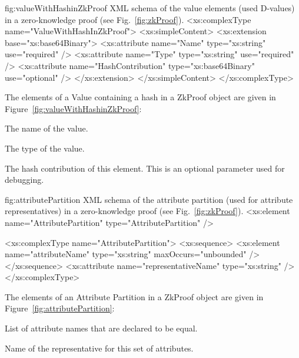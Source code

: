 \begin{xml}
{fig:valueWithHashinZkProof}
{XML schema of the value elements (used D-values) in a 
zero-knowledge proof (see Fig.~\ref{fig:zkProof}).}
<xs:complexType name="ValueWithHashInZkProof">
  <xs:simpleContent>
    <xs:extension base="xs:base64Binary">
      <xs:attribute name="Name" type="xs:string" use="required" />
      <xs:attribute name="Type" type="xs:string" use="required" />
      <xs:attribute name="HashContribution" type="xs:base64Binary"
        use="optional" />
    </xs:extension>
  </xs:simpleContent>
</xs:complexType>
\end{xml}

\vspace{3pt}\noindent The elements of a Value containing a hash in a ZkProof object are given in Figure~\ref{fig:valueWithHashinZkProof}:
\begin{parameter}
The name of the value.
\end{parameter}
\begin{parameter}
The type of the value.
\end{parameter}
\begin{parameter}
The hash contribution of this element. This is an optional parameter used for debugging.
\end{parameter}


\begin{xml}
{fig:attributePartition}
{XML schema of the attribute partition (used for attribute representatives) in a 
zero-knowledge proof (see Fig.~\ref{fig:zkProof}).}
<xs:element name="AttributePartition" type="AttributePartition" />

<xs:complexType name="AttributePartition">
  <xs:sequence>
    <xs:element name="attributeName" type="xs:string"
      maxOccurs="unbounded" />
  </xs:sequence>
  <xs:attribute name="representativeName" type="xs:string" />
</xs:complexType>
\end{xml}


\vspace{3pt}\noindent The elements of an Attribute Partition in a ZkProof object are given in Figure~\ref{fig:attributePartition}:
\begin{parameter}
List of attribute names that are declared to be equal.
\end{parameter}
\begin{parameter}
Name of the representative for this set of attributes.
\end{parameter}
  

